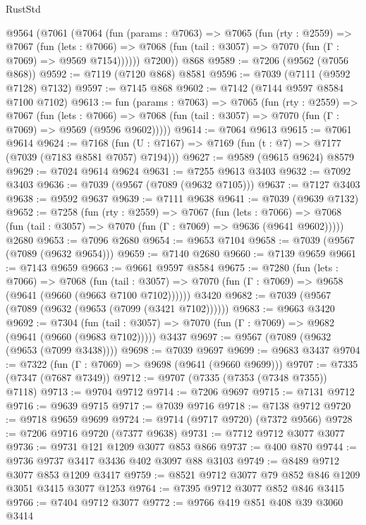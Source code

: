 \begin{lexlean}{RustStd}
\begin{coremodule}
{\begin{coremodule}
{{{{{{{{{{{{{{{{{{{{{{{{{{{{{{{{    @9564
      (@7061
        (@7064
          (fun (params : @7063) =>
          @7065
            (fun (rty : @2559) =>
            @7067
              (fun (lets : @7066) =>
              @7068 (fun (tail : @3057) => @7070 (fun (Γ : @7069) => @9569 @7154))))))
        @7200))
    @868
@9589 := @7206 (@9562 (@7056 @868))
@9592 := @7119 (@7120 @868) @8581
@9596 := @7039 (@7111 (@9592 @7128) @7132)
@9597 := @7145 @868
@9602 := @7142 (@7144 @9597 @8584 @7100 @7102)
@9613 := fun (params : @7063) =>
  @7065
    (fun (rty : @2559) =>
    @7067
      (fun (lets : @7066) =>
      @7068 (fun (tail : @3057) => @7070 (fun (Γ : @7069) => @9569 (@9596 @9602)))))
@9614 := @7064 @9613
@9615 := @7061 @9614
@9624 := @7168 (fun (U : @7167) => @7169 (fun (t : @7) => @7177 (@7039 (@7183 @8581 @7057) @7194)))
@9627 := @9589 (@9615 @9624) @8579
@9629 := @7024 @9614 @9624
@9631 := @7255 @9613 @3403
@9632 := @7092 @3403
@9636 := @7039 (@9567 (@7089 (@9632 @7105)))
@9637 := @7127 @3403
@9638 := @9592 @9637
@9639 := @7111 @9638
@9641 := @7039 (@9639 @7132)
@9652 := @7258
    (fun (rty : @2559) =>
    @7067
      (fun (lets : @7066) =>
      @7068 (fun (tail : @3057) => @7070 (fun (Γ : @7069) => @9636 (@9641 @9602)))))
    @2680
@9653 := @7096 @2680
@9654 := @9653 @7104
@9658 := @7039 (@9567 (@7089 (@9632 @9654)))
@9659 := @7140 @2680
@9660 := @7139 @9659
@9661 := @7143 @9659
@9663 := @9661 @9597 @8584
@9675 := @7280
    (fun (lets : @7066) =>
    @7068
      (fun (tail : @3057) => @7070 (fun (Γ : @7069) => @9658 (@9641 (@9660 (@9663 @7100 @7102))))))
    @3420
@9682 := @7039 (@9567 (@7089 (@9632 (@9653 (@7099 (@3421 @7102))))))
@9683 := @9663 @3420
@9692 := @7304
    (fun (tail : @3057) => @7070 (fun (Γ : @7069) => @9682 (@9641 (@9660 (@9683 @7102)))))
    @3437
@9697 := @9567 (@7089 (@9632 (@9653 (@7099 @3438))))
@9698 := @7039 @9697
@9699 := @9683 @3437
@9704 := @7322 (fun (Γ : @7069) => @9698 (@9641 (@9660 @9699)))
@9707 := @7335 (@7347 (@7687 @7349))
@9712 := @9707 (@7335 (@7353 (@7348 @7355)) @7118)
@9713 := @9704 @9712
@9714 := @7206 @9697
@9715 := @7131 @9712
@9716 := @9639 @9715
@9717 := @7039 @9716
@9718 := @7138 @9712
@9720 := @9718 @9659 @9699
@9724 := @9714 (@9717 @9720) (@7372 @9566)
@9728 := @7206 @9716 @9720 (@7377 @9638)
@9731 := @7712 @9712 @3077 @3077
@9736 := @9731 @121 @1209 @3077 @853 @866
@9737 := @400 @870
@9744 := @9736 @9737 @3417 @3436 @402 @3097 @88 @3103
@9749 := @8489 @9712 @3077 @853 @1209 @3417
@9759 := @8521 @9712 @3077 @79 @852 @846 @1209 @3051 @3415 @3077 @1253
@9764 := @7395 @9712 @3077 @852 @846 @3415
@9766 := @7404 @9712 @3077
@9772 := @9766 @419 @851 @408 @39 @3060 @3414
}}}}}}}}}}}}}}}}}}}}}}}}}}}}}}}}
\end{coremodule}}
\end{coremodule}
\end{lexlean}
